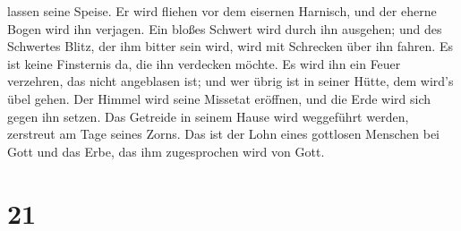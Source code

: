 lassen seine Speise.  Er wird fliehen vor dem eisernen
Harnisch, und der eherne Bogen wird ihn verjagen.  Ein
bloßes Schwert wird durch ihn ausgehen; und des Schwertes Blitz, der ihm
bitter sein wird, wird mit Schrecken über ihn fahren.  Es
ist keine Finsternis da, die ihn verdecken möchte. Es wird ihn ein Feuer
verzehren, das nicht angeblasen ist; und wer übrig ist in seiner Hütte,
dem wird's übel gehen.  Der Himmel wird seine Missetat
eröffnen, und die Erde wird sich gegen ihn setzen.  Das
Getreide in seinem Hause wird weggeführt werden, zerstreut am Tage
seines Zorns.  Das ist der Lohn eines gottlosen Menschen
bei Gott und das Erbe, das ihm zugesprochen wird von Gott.

\hypertarget{section-20}{%
\section{21}\label{section-20}}

